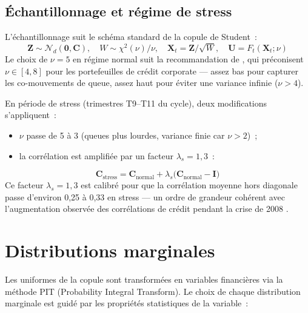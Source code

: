 \documentclass[12pt, a4paper, twoside, openright]{report}
\theoremstyle{definition}
\begin{document}
\subsection{Échantillonnage et régime de stress}

L'échantillonnage suit le schéma standard de la copule de Student~:
%
\begin{equation}
\label{eq:copula_sampling}
\mathbf{Z} \sim \mathcal{N}_d(\mathbf{0}, \mathbf{C}), \quad
W \sim \chi^2(\nu)/\nu, \quad
\mathbf{X}_t = \mathbf{Z} / \sqrt{W}, \quad
\mathbf{U} = F_t(\mathbf{X}_t; \nu)
\end{equation}
%
Le choix de $\nu = 5$ en régime normal suit la recommandation de \citet{mcneil_frey_embrechts2015}, qui préconisent $\nu \in [4, 8]$ pour les portefeuilles de crédit corporate --- assez bas pour capturer les co-mouvements de queue, assez haut pour éviter une variance infinie ($\nu > 4$).

En période de stress (trimestres T9--T11 du cycle), deux modifications s'appliquent~:
\begin{itemize}[nosep]
  \item $\nu$ passe de 5 à 3 (queues plus lourdes, variance finie car $\nu > 2$)~;
  \item la corrélation est amplifiée par un facteur $\lambda_s = 1{,}3$~:
\end{itemize}
%
\begin{equation}
\mathbf{C}_{\text{stress}} = \mathbf{C}_{\text{normal}} + \lambda_s \bigl(\mathbf{C}_{\text{normal}} - \mathbf{I}\bigr)
\end{equation}
%
Ce facteur $\lambda_s = 1{,}3$ est calibré pour que la corrélation moyenne hors diagonale passe d'environ 0{,}25 à 0{,}33 en stress --- un ordre de grandeur cohérent avec l'augmentation observée des corrélations de crédit pendant la crise de 2008 \citep{mcneil_frey_embrechts2015}.


\section{Distributions marginales}
\label{sec:donnees:marginales}

Les uniformes de la copule sont transformées en variables financières via la méthode PIT (Probability Integral Transform).
Le choix de chaque distribution marginale est guidé par les propriétés statistiques de la variable~:
\end{document}
